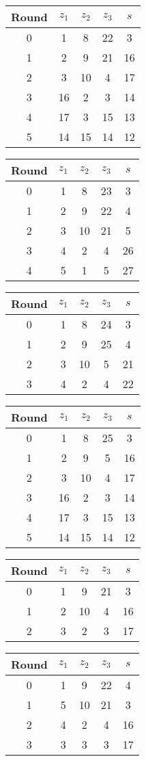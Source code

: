 \begin{multicols}{2}
\begin{tabular}{c | c | c | c | c }
Round & $z_1$ & $z_2$ & $z_3$ & $s$ \\
\hline
0 & 1 & 8 & 22 & 3 \\
1 & 2 & 9 & 21 & 16 \\
2 & 3 & 10 & 4 & 17 \\
3 & 16 & 2 & 3 & 14 \\
4 & 17 & 3 & 15 & 13 \\
5 & 14 & 15 & 14 & 12
\end{tabular}


\begin{tabular}{c | c | c | c | c }
Round & $z_1$ & $z_2$ & $z_3$ & $s$ \\
\hline
0 & 1 & 8 & 23 & 3 \\
1 & 2 & 9 & 22 & 4 \\
2 & 3 & 10 & 21 & 5 \\
3 & 4 & 2 & 4 & 26 \\
4 & 5 & 1 & 5 & 27
\end{tabular}


\begin{tabular}{c | c | c | c | c }
Round & $z_1$ & $z_2$ & $z_3$ & $s$ \\
\hline
0 & 1 & 8 & 24 & 3 \\
1 & 2 & 9 & 25 & 4 \\
2 & 3 & 10 & 5 & 21 \\
3 & 4 & 2 & 4 & 22
\end{tabular}


\begin{tabular}{c | c | c | c | c }
Round & $z_1$ & $z_2$ & $z_3$ & $s$ \\
\hline
0 & 1 & 8 & 25 & 3 \\
1 & 2 & 9 & 5 & 16 \\
2 & 3 & 10 & 4 & 17 \\
3 & 16 & 2 & 3 & 14 \\
4 & 17 & 3 & 15 & 13 \\
5 & 14 & 15 & 14 & 12
\end{tabular}


\begin{tabular}{c | c | c | c | c }
Round & $z_1$ & $z_2$ & $z_3$ & $s$ \\
\hline
0 & 1 & 9 & 21 & 3 \\
1 & 2 & 10 & 4 & 16 \\
2 & 3 & 2 & 3 & 17
\end{tabular}


\begin{tabular}{c | c | c | c | c }
Round & $z_1$ & $z_2$ & $z_3$ & $s$ \\
\hline
0 & 1 & 9 & 22 & 4 \\
1 & 5 & 10 & 21 & 3 \\
2 & 4 & 2 & 4 & 16 \\
3 & 3 & 3 & 3 & 17
\end{tabular}



\end{multicols}
